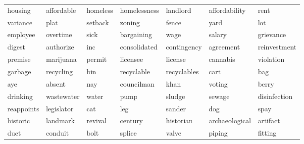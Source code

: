 \begin{table}[ht]
\begin{tabular}{lllllll}
  \cellcolor{blue!10}housing & \cellcolor{blue!10}affordable & \cellcolor{blue!10}homeless & \cellcolor{blue!10}homelessness & \cellcolor{blue!10}landlord & \cellcolor{blue!10}affordability & \cellcolor{blue!10}rent \\ 
  \cellcolor{blue!10}variance & \cellcolor{blue!10}plat & \cellcolor{blue!10}setback & \cellcolor{blue!10}zoning & \cellcolor{blue!10}fence & \cellcolor{blue!10}yard & \cellcolor{blue!10}lot \\ 
  \cellcolor{blue!10}employee & \cellcolor{blue!10}overtime & \cellcolor{blue!10}sick & \cellcolor{blue!10}bargaining & \cellcolor{blue!10}wage & \cellcolor{blue!10}salary & \cellcolor{blue!10}grievance \\ 
  \cellcolor{blue!20}digest & \cellcolor{blue!20}authorize & \cellcolor{blue!20}inc & \cellcolor{blue!20}consolidated & \cellcolor{blue!20}contingency & \cellcolor{blue!20}agreement & \cellcolor{blue!20}reinvestment \\ 
  \cellcolor{red!10}premise & \cellcolor{red!10}marijuana & \cellcolor{red!10}permit & \cellcolor{red!10}licensee & \cellcolor{red!10}license & \cellcolor{red!10}cannabis & \cellcolor{red!10}violation \\ 
  \cellcolor{red!10}garbage & \cellcolor{red!10}recycling & \cellcolor{red!10}bin & \cellcolor{red!10}recyclable & \cellcolor{red!10}recyclables & \cellcolor{red!10}cart & \cellcolor{red!10}bag \\ 
  \cellcolor{blue!20}aye & \cellcolor{blue!20}absent & \cellcolor{blue!20}nay & \cellcolor{blue!20}councilman & \cellcolor{blue!20}khan & \cellcolor{blue!20}voting & \cellcolor{blue!20}berry \\ 
  \cellcolor{red!20}drinking & \cellcolor{red!20}wastewater & \cellcolor{red!20}water & \cellcolor{red!20}pump & \cellcolor{red!20}sludge & \cellcolor{red!20}sewage & \cellcolor{red!20}disinfection \\ 
  \cellcolor{red!20}reappoints & \cellcolor{red!20}legislator & \cellcolor{red!20}cat & \cellcolor{red!20}leg & \cellcolor{red!20}sander & \cellcolor{red!20}dog & \cellcolor{red!20}spay \\ 
  \cellcolor{blue!10}historic & \cellcolor{blue!10}landmark & \cellcolor{blue!10}revival & \cellcolor{blue!10}century & \cellcolor{blue!10}historian & \cellcolor{blue!10}archaeological & \cellcolor{blue!10}artifact \\ 
  \cellcolor{red!10}duct & \cellcolor{red!10}conduit & \cellcolor{red!10}bolt & \cellcolor{red!10}splice & \cellcolor{red!10}valve & \cellcolor{red!10}piping & \cellcolor{red!10}fitting \\ 

\end{tabular}
\end{table}
